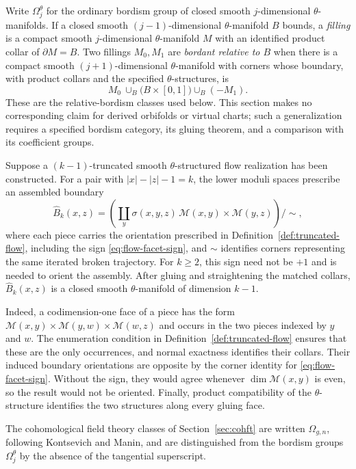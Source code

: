 \documentclass[11pt,letterpaper,twoside]{article}
\theoremstyle{plain}
\theoremstyle{definition}
\theoremstyle{remark}
\begin{document}
Write \(\Omega_j^\theta\) for the ordinary bordism group of closed smooth \(j\)-dimensional \(\theta\)-manifolds.  If a closed smooth \((j-1)\)-dimensional \(\theta\)-manifold \(B\) bounds, a \emph{filling} is a compact smooth \(j\)-dimensional \(\theta\)-manifold \(M\) with an identified product collar of \(\partial M=B\).  Two fillings \(M_0,M_1\) are \emph{bordant relative to \(B\)} when there is a compact smooth \((j+1)\)-dimensional \(\theta\)-manifold with corners whose boundary, with product collars and the specified \(\theta\)-structures, is
\[
 M_0\ \cup_B\bigl(B\times[0,1]\bigr)\cup_B(-M_1).
\]
These are the relative-bordism classes used below.  This section makes no corresponding claim for derived orbifolds or virtual charts; such a generalization requires a specified bordism category, its gluing theorem, and a comparison with its coefficient groups.

Suppose a \((k-1)\)-truncated smooth \(\theta\)-structured flow realization has been constructed.  For a pair with \(|x|-|z|-1=k\), the lower moduli spaces prescribe an assembled boundary
\begin{equation}\label{eq:assembled-flow-boundary}
 \widehat B_k(x,z)
 =\left(\coprod_y
 \sigma(x,y,z)\,
 \mathcal M(x,y)\times\mathcal M(y,z)\right)\big/\!\sim,
\end{equation}
where each piece carries the orientation prescribed in Definition~\ref{def:truncated-flow}, including the sign \eqref{eq:flow-facet-sign}, and \(\sim\) identifies corners representing the same iterated broken trajectory.  For \(k\geq2\), this sign need not be \(+1\) and is needed to orient the assembly.  After gluing and straightening the matched collars, \(\widehat B_k(x,z)\) is a closed smooth \(\theta\)-manifold of dimension \(k-1\).

Indeed, a codimension-one face of a piece has the form \(\mathcal M(x,y)\times\mathcal M(y,w)\times\mathcal M(w,z)\) and occurs in the two pieces indexed by \(y\) and \(w\).  The enumeration condition in Definition~\ref{def:truncated-flow} ensures that these are the only occurrences, and normal exactness identifies their collars.  Their induced boundary orientations are opposite by the corner identity for \eqref{eq:flow-facet-sign}.  Without the sign, they would agree whenever \(\dim\mathcal M(x,y)\) is even, so the result would not be oriented.  Finally, product compatibility of the \(\theta\)-structure identifies the two structures along every gluing face.

The cohomological field theory classes of Section~\ref{sec:cohft} are written \(\Omega_{g,n}\), following Kontsevich and Manin, and are distinguished from the bordism groups \(\Omega_j^\theta\) by the absence of the tangential superscript.
\end{document}
